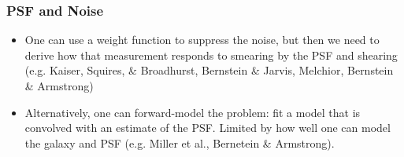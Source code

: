 \documentclass{beamer}
\begin{document}
\frame
{
    \frametitle{PSF and Noise}
    
    \begin{itemize}

        \item One can use a weight function to suppress the noise, but then we
            need to derive how that measurement responds to smearing by the PSF
            and shearing (e.g. Kaiser, Squires, \& Broadhurst, Bernstein \& Jarvis, Melchior,
                    Bernstein \& Armstrong)

        \item Alternatively, one can forward-model the problem: fit a model that is
            convolved with an estimate of the PSF.  Limited by how well one can
            model the galaxy and PSF (e.g. Miller et al., Bernetein \& Armstrong).

    \end{itemize}
}
\end{document}

